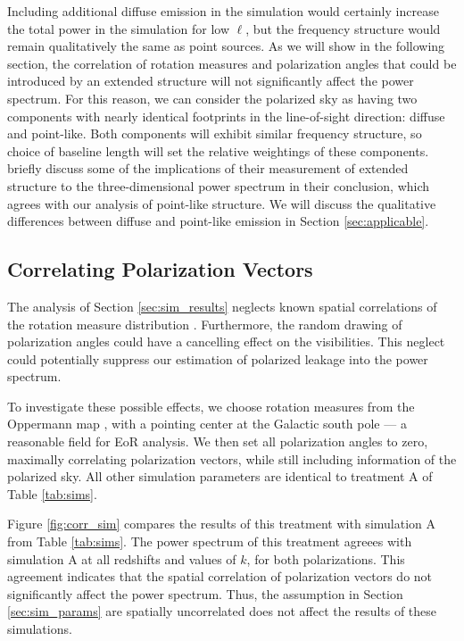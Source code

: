 Including additional diffuse emission in the simulation would certainly increase the total power in the
simulation for low $\ell$, but the frequency structure would remain qualitatively the same as point
sources. As we will show in the following section, the correlation of rotation measures and
polarization angles that could be introduced by an extended structure will not significantly affect
the power spectrum. For this reason, we can consider the polarized sky as having two components with
nearly identical footprints in the line-of-sight direction: diffuse and point-like. Both components
will exhibit similar frequency structure, so choice of baseline length will set the relative
weightings of these components. \citet{Bernardi2009} briefly discuss some of the implications of
their measurement of extended structure to the three-dimensional power spectrum in their conclusion,
which agrees with our analysis of point-like structure. We will discuss the qualitative differences
between diffuse and point-like emission in Section \ref{sec:applicable}.

\subsection{Correlating Polarization Vectors}

The analysis of Section \ref{sec:sim_results} neglects known spatial correlations of the rotation
measure distribution \cite{Kronberg2011}. Furthermore, the random drawing of polarization angles
could have a cancelling effect on the visibilities. This neglect could potentially suppress our
estimation of polarized leakage into the power spectrum. 

To investigate these possible effects, we choose rotation measures from the Oppermann map
\cite{Oppermann2012}, with a pointing center at the Galactic south pole --- a reasonable field for
EoR analysis. We then set all polarization angles to zero, maximally correlating polarization
vectors, while still including information of the polarized sky. All other simulation parameters are
identical to treatment A of Table \ref{tab:sims}.

Figure \ref{fig:corr_sim} compares the results of this treatment  with simulation A from Table
\ref{tab:sims}. The power spectrum of this treatment agreees with simulation A at all redshifts and
values of $k$, for both polarizations. This agreement indicates that the spatial correlation of
polarization vectors do not significantly affect the power spectrum. Thus, the assumption in Section
\ref{sec:sim_params} are spatially uncorrelated does not affect the results of these simulations.
